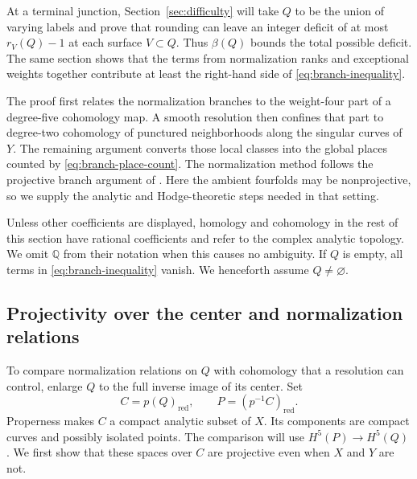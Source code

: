 \documentclass[11pt]{amsart}
\theoremstyle{definition}
\theoremstyle{remark}
\numberwithin{equation}{section}
\newcommand{\Q}{\mathbb{Q}}
\begin{document}
At a terminal junction, Section~\ref{sec:difficulty} will take $Q$ to
be the union of varying labels and prove that rounding can leave an
integer deficit of at most $r_V(Q)-1$ at each surface $V\subset Q$.
Thus $\beta(Q)$ bounds the total possible deficit.  The same section
shows that the terms from normalization ranks and exceptional weights
together contribute at least the right-hand side of
\eqref{eq:branch-inequality}.

The proof first relates the normalization branches to the weight-four
part of a degree-five cohomology map.  A smooth resolution then confines
that part to degree-two cohomology of punctured neighborhoods along the
singular curves of $Y$.  The remaining argument converts those local classes into the
global places counted by \eqref{eq:branch-place-count}.  The
normalization method follows the projective branch argument of
\cite[Section~5, especially Lemma~5.2]{ProjectiveLCFourfolds}.  Here the
ambient fourfolds may be nonprojective, so we supply the analytic and
Hodge-theoretic steps needed in that setting.

Unless other coefficients are displayed, homology and cohomology in
the rest of this section have rational coefficients and refer to the
complex analytic topology.  We omit $\Q$ from their notation when this
causes no ambiguity.  If $Q$ is empty,
all terms in \eqref{eq:branch-inequality} vanish.  We henceforth assume
$Q\ne\varnothing$.

\subsection{Projectivity over the center and normalization relations}

To compare normalization relations on $Q$ with cohomology that a
resolution can control, enlarge $Q$ to the full inverse image of its
center.  Set
\begin{equation}\label{eq:branch-projective-loci}
 C=p(Q)_{\mathrm{red}},\qquad
 P=(p^{-1}C)_{\mathrm{red}}.
\end{equation}
Properness makes $C$ a compact analytic subset of $X$.  Its components
are compact curves and possibly isolated points.  The comparison will
use $H^5(P)\to H^5(Q)$.  We first show that these spaces over $C$ are
projective even when $X$ and $Y$ are not.
\end{document}
